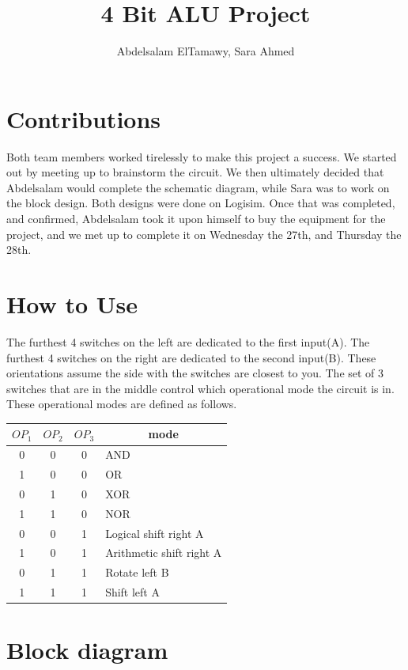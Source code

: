 \documentclass[12pt,a4paper]{article}
\author{Abdelsalam ElTamawy, Sara Ahmed}
\title{4 Bit ALU Project}
\begin{document}
\maketitle


\pagebreak

\section{Contributions}
Both team members worked tirelessly to make this project a success. We started out by meeting up to brainstorm the circuit. We then ultimately decided that Abdelsalam would complete the schematic diagram, while Sara was to work on the block design. Both designs were done on Logisim. Once that was completed, and confirmed, Abdelsalam took it upon himself to buy the equipment for the project, and we met up to complete it on Wednesday the 27th, and Thursday the 28th.

\section{How to Use}
The furthest 4 switches on the left are dedicated to the first input(A). The furthest 4 switches on the right are dedicated to the second input(B). These orientations assume the side with the switches are closest to you. The set of 3 switches that are in the middle control which operational mode the circuit is in. These operational modes are defined as follows.

\begin{center}

\begin{tabular}{c|c|c||l}
$OP_1$ & $OP_2$ & $OP_3$ & \multicolumn{1}{|c}{mode} \\ 
\hline 
0 & 0 & 0 & AND \\ 
\hline 
1 & 0 & 0 & OR \\ 
\hline 
0 & 1 & 0 & XOR \\ 
\hline 
1 & 1 & 0 & NOR \\ 
\hline 
0 & 0 & 1 & Logical shift right A \\ 
\hline 
1 & 0 & 1 & Arithmetic shift right A \\ 
\hline 
0 & 1 & 1 & Rotate left B \\ 
\hline 
1 & 1 & 1 & Shift left A \\ 
\end{tabular}
\end{center}

\section{Block diagram}
\end{document}
